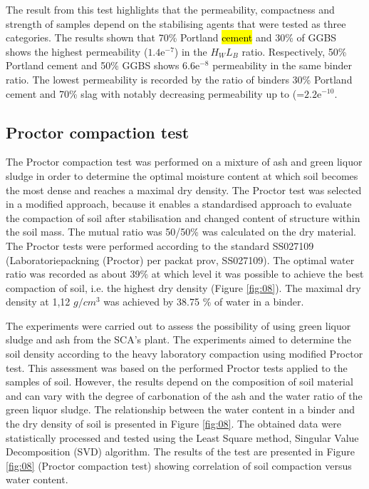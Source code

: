 \documentclass{amestyle}
\begin{document}
The result from this test highlights that the permeability, compactness and strength of samples depend on the stabilising agents that were tested as three categories. The results shown that 70\% Portland \hl{cement} and 30\% of GGBS shows the highest permeability ($1.4\mathrm{e}^{-7}$) in the $H_WL_B$ ratio. Respectively, 50\% Portland cement and 50\% GGBS shows $6.6\mathrm{e}^{-8}$ permeability in the same binder ratio. The lowest permeability is recorded by the ratio of binders 30\% Portland cement and 70\% slag with notably decreasing permeability up to (=$2.2\mathrm{e}^{-10}$. 

\subsection{Proctor compaction test}
The Proctor compaction test was performed on a mixture of ash and green liquor sludge in order to determine the optimal moisture content at which soil becomes the most dense and reaches a maximal dry density. The Proctor test was selected in a modified approach, because it enables a standardised approach to evaluate the compaction of soil after stabilisation and changed content of structure within the soil mass. The mutual ratio was 50/50\% was calculated on the dry material. The Proctor tests were performed according to the standard SS027109 (Laboratoriepackning (Proctor) per packat prov, SS027109). The optimal water ratio was recorded as about 39\% at which level it was possible to achieve the best compaction of soil, i.e. the highest dry density (Figure \ref{fig:08}). The maximal dry density at 1,12 $g/cm^3$ was achieved by 38.75 \% of water in a binder. 

The experiments were carried out to assess the possibility of using green liquor sludge and ash from the SCA's plant. The experiments aimed to determine the soil density according to the heavy laboratory compaction using modified Proctor test. This assessment was based on the performed Proctor tests applied to the samples of soil. However, the results depend on the composition of soil material and can vary with the degree of carbonation of the ash and the water ratio of the green liquor sludge. The relationship between the water content in a binder and the dry density of soil is presented in Figure \ref{fig:08}. The obtained data were statistically processed and tested using the Least Square method, Singular Value Decomposition (SVD) algorithm. The results of the test are presented in Figure \ref{fig:08} (Proctor compaction test) showing correlation of soil compaction versus water content. 
\end{document}

